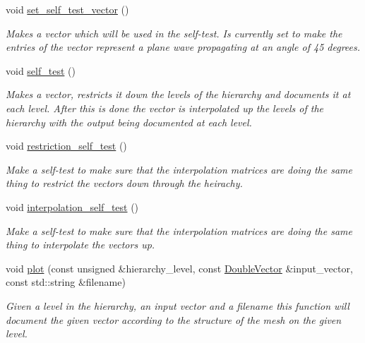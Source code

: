 \begin{DoxyCompactItemize}
void \hyperlink{classoomph_1_1MGSolver_a081eb7bcdd49dfce9a03f0ae3ab4cfab}{set\+\_\+self\+\_\+test\+\_\+vector} ()
\begin{DoxyCompactList}\small\item\em Makes a vector which will be used in the self-\/test. Is currently set to make the entries of the vector represent a plane wave propagating at an angle of 45 degrees. \end{DoxyCompactList}\item 
void \hyperlink{classoomph_1_1MGSolver_a88efa5f110e824947f50306e3b56e07b}{self\+\_\+test} ()
\begin{DoxyCompactList}\small\item\em Makes a vector, restricts it down the levels of the hierarchy and documents it at each level. After this is done the vector is interpolated up the levels of the hierarchy with the output being documented at each level. \end{DoxyCompactList}\item 
void \hyperlink{classoomph_1_1MGSolver_acfc50241a9dc27e7e60b06564e5dd726}{restriction\+\_\+self\+\_\+test} ()
\begin{DoxyCompactList}\small\item\em Make a self-\/test to make sure that the interpolation matrices are doing the same thing to restrict the vectors down through the heirachy. \end{DoxyCompactList}\item 
void \hyperlink{classoomph_1_1MGSolver_a25fbe00e277a8fba8c7f54902b92c417}{interpolation\+\_\+self\+\_\+test} ()
\begin{DoxyCompactList}\small\item\em Make a self-\/test to make sure that the interpolation matrices are doing the same thing to interpolate the vectors up. \end{DoxyCompactList}\item 
void \hyperlink{classoomph_1_1MGSolver_a4af1269b75f9dcd598474d242de1f4ef}{plot} (const unsigned \&hierarchy\+\_\+level, const \hyperlink{classoomph_1_1DoubleVector}{Double\+Vector} \&input\+\_\+vector, const std\+::string \&filename)
\begin{DoxyCompactList}\small\item\em Given a level in the hierarchy, an input vector and a filename this function will document the given vector according to the structure of the mesh on the given level. \end{DoxyCompactList}\item 

\end{DoxyCompactItemize}
